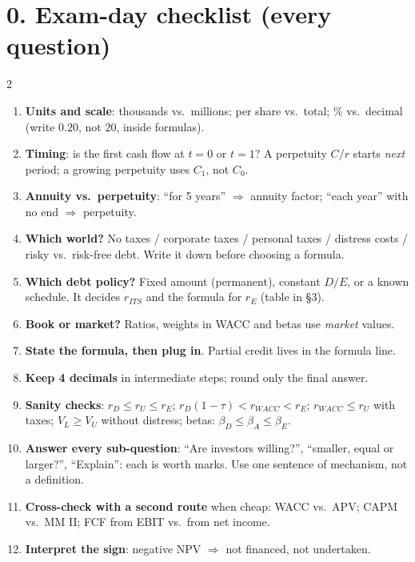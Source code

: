 \documentclass[10pt,a4paper]{article}
\begin{document}
\section*{0. Exam-day checklist (every question)}
\begin{multicols}{2}
\begin{enumerate}[label=\arabic*.]
  \item \textbf{Units and scale}: thousands vs.\ millions; per share vs.\ total; \% vs.\ decimal
        (write $0.20$, not $20$, inside formulas).
  \item \textbf{Timing}: is the first cash flow at $t=0$ or $t=1$? A perpetuity $C/r$ starts
        \emph{next} period; a growing perpetuity uses $C_1$, not $C_0$.
  \item \textbf{Annuity vs.\ perpetuity}: ``for 5 years'' $\Rightarrow$ annuity factor; ``each year''
        with no end $\Rightarrow$ perpetuity.
  \item \textbf{Which world?} No taxes / corporate taxes / personal taxes / distress costs / risky vs.\
        risk-free debt. Write it down before choosing a formula.
  \item \textbf{Which debt policy?} Fixed amount (permanent), constant $D/E$, or a known schedule.
        It decides $r_{ITS}$ and the formula for $r_E$ (table in §3).
  \item \textbf{Book or market?} Ratios, weights in WACC and betas use \emph{market} values.
  \item \textbf{State the formula, then plug in}. Partial credit lives in the formula line.
  \item \textbf{Keep 4 decimals} in intermediate steps; round only the final answer.
  \item \textbf{Sanity checks}: $r_D\le r_U\le r_E$; $r_D(1-\tau)<r_{WACC}<r_E$; $r_{WACC}\le r_U$
        with taxes; $V_L\ge V_U$ without distress; betas: $\beta_D\le\beta_A\le\beta_E$.
  \item \textbf{Answer every sub-question}: ``Are investors willing?'', ``smaller, equal or larger?'',
        ``Explain'': each is worth marks. Use one sentence of mechanism, not a definition.
  \item \textbf{Cross-check with a second route} when cheap: WACC vs.\ APV; CAPM vs.\ MM II; FCF from
        EBIT vs.\ from net income.
  \item \textbf{Interpret the sign}: negative NPV $\Rightarrow$ not financed, not undertaken.
\end{enumerate}
\end{multicols}
\end{document}
